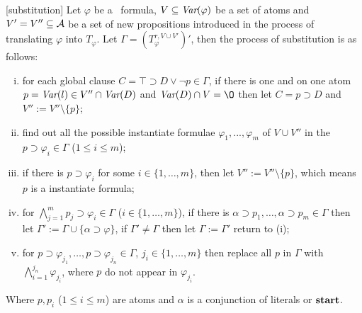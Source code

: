 \documentclass{article}
\begin{document}
\begin{definition}\label{def:subst}
[substitution] Let $\varphi$ be a \CTL\ formula, $V \subseteq \textit{Var}(\varphi)$ be a set of atoms and $V'=V'' \subseteq {\cal A}$ be a set of new propositions introduced in the process of translating $\varphi$ into $T_{\varphi}$. Let $\Gamma=(T_{\varphi}^{r,V \cup V'})'$, then the process of substitution is as follows:
\begin{enumerate}[(i)]
  \item for each global clause $C= \top \supset D \vee \neg p \in \Gamma$, if there is one and on one atom $p=\textit{Var}(l) \in V''\cap \textit{Var}(D)$  and $\Var(D) \cap V = {\O}$ then let $C = p \supset D$ and $V'':=V''\setminus \{p\}$;
  \item find out all the possible instantiate formulae $\varphi_1, ..., \varphi_m$ of $V \cup V''$ in the $p\supset \varphi_i \in \Gamma$ ($1\leq i\leq m$);
  \item if there is $p\supset \varphi_i$ for some $i\in \{1,\dots, m\}$, then let $V'':=V''\setminus \{p\}$, which means $p$ is a instantiate formula;
  \item for $\bigwedge_{j=1}^m p_j \supset \varphi_i \in \Gamma$ ($i\in \{1,\dots, m\}$), if there is $\alpha \supset p_1,\dots, \alpha \supset p_m \in \Gamma$ then let $\Gamma' := \Gamma \cup \{\alpha \supset \varphi\}$, if $\Gamma'\neq \Gamma$ then let $\Gamma:=\Gamma'$ return to (i);
  \item for $p\supset \varphi_{j_1}, \dots, p \supset \varphi_{j_n}\in \Gamma$, $j_i \in \{1,\dots, m\}$ then replace all $p$ in $\Gamma$ with $\bigwedge_{i=1}^{j_n} \varphi_{j_i}$, where $p$ do not appear in $\varphi_{j_i}$.
\end{enumerate}
Where $p, p_i$ ($1 \leq i\leq m$) are atoms and $\alpha$ is a conjunction of literals or $\textbf{start}$.
\end{definition}
\end{document}
